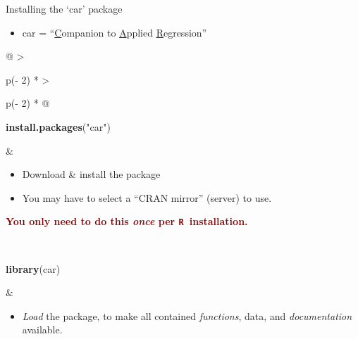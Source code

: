 \documentclass[
  11pt,
  ignorenonframetext,
]{beamer}
\newcommand{\VERB}{\Verb[commandchars=\\\{\}]}
\newenvironment{Shaded}{\begin{snugshade}}{\end{snugshade}}
\newcommand{\FunctionTok}[1]{\textcolor[rgb]{0.13,0.29,0.53}{\textbf{#1}}}
\newcommand{\NormalTok}[1]{#1}
\newcommand{\StringTok}[1]{\textcolor[rgb]{0.31,0.60,0.02}{#1}}
\providecommand{\tightlist}{%
  \setlength{\itemsep}{0pt}\setlength{\parskip}{0pt}}
\newcommand{\important}[1]{\textcolor{darkred}{#1}}
\begin{document}
\begin{frame}{Installing the `car' package}
\protect\hypertarget{installing-the-car-package}{}
\begin{itemize}
\tightlist
\item
  car = ``\ul{C}ompanion to \ul{A}pplied \ul{R}egression''

\end{itemize}

\begin{longtable}[]{@{}
  >{\raggedright\arraybackslash}p{(\columnwidth - 2\tabcolsep) * }
  >{\raggedright\arraybackslash}p{(\columnwidth - 2\tabcolsep) * }@{}}
\toprule\noalign{}
\endhead
\begin{minipage}[t]{\linewidth}\raggedright
\begin{Shaded}
\begin{Highlighting}[]
\FunctionTok{install.packages}\NormalTok{(}\StringTok{"car"}\NormalTok{)}
\end{Highlighting}
\end{Shaded}
\end{minipage} & \begin{minipage}[t]{\linewidth}\raggedright
\begin{itemize}
\tightlist
\item
  Download \& install the package
\item
  You may have to select a ``CRAN mirror''\footnotemark{} (server) to
  use.
\end{itemize}

\important{\textbf{%
You only need to do this \textit{once}
per \texttt{R}~installation.}}
\end{minipage} \\
\begin{minipage}[t]{\linewidth}\raggedright
\begin{Shaded}
\begin{Highlighting}[]
\FunctionTok{library}\NormalTok{(car)}
\end{Highlighting}
\end{Shaded}
\end{minipage} & \begin{minipage}[t]{\linewidth}\raggedright
\begin{itemize}
\tightlist
\item
  \emph{Load} the package, to make all contained \emph{functions}, data,
  and \emph{documentation} available.
\end{itemize}


\end{minipage}
\end{longtable}
\end{frame}
\end{document}
